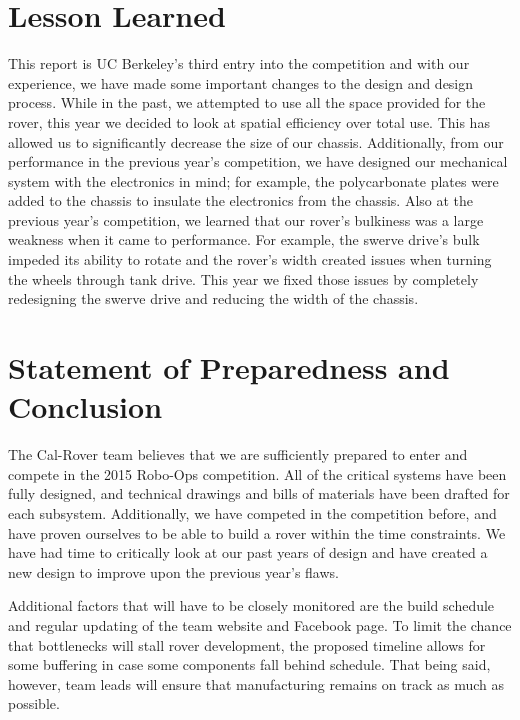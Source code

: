\documentclass[titlepage,twocolumn,10pt]{article}
\begin{document}
    \section{Lesson Learned}
    This report is UC Berkeley's third entry into the competition and with our experience, we have made some important changes to the design and design process. While in the past, we attempted to use all the space provided for the rover, this year we decided to look at spatial efficiency over total use. This has allowed us to significantly decrease the size of our chassis. Additionally, from our performance in the previous year's competition, we have designed our mechanical system with the electronics in mind; for example, the polycarbonate plates were added to the chassis to insulate the electronics from the chassis. Also at the previous year's competition, we learned that our rover's bulkiness was a large weakness when it came to performance. For example, the swerve drive's bulk impeded its ability to rotate and the rover's width created issues when turning the wheels through tank drive. This year we fixed those issues by completely redesigning the swerve drive and reducing the width of the chassis.
  
    \section{Statement of Preparedness and Conclusion}
    The Cal-Rover team believes that we are sufficiently prepared to enter and compete in the 2015 Robo-Ops competition. All of the critical systems have been fully designed, and technical drawings and bills of materials have been drafted for each subsystem. Additionally, we have competed in the competition before, and have proven ourselves to be able to build a rover within the time constraints. We have had time to critically look at our past years of design and have created a new design to improve upon the previous year's flaws. 

    Additional factors that will have to be closely monitored are the build schedule and regular updating of the team website and Facebook page. To limit the chance that bottlenecks will stall rover development, the proposed timeline allows for some buffering in case some components fall behind schedule. That being said, however, team leads will ensure that manufacturing remains on track as much as possible.
\end{document}
